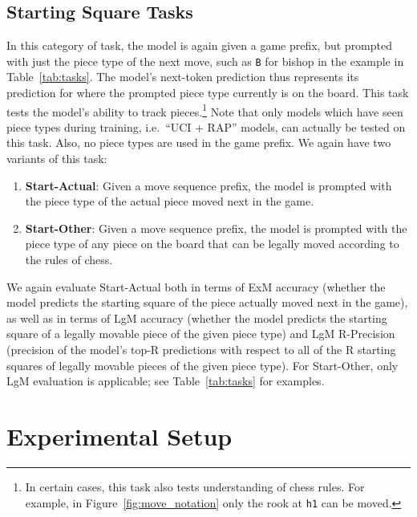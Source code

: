 \documentclass[12pt]{thesis-umich}[thesis]
\newcommand{\pos}[1]{\texttt{#1}}
\newcommand{\legalmove}{LgM\xspace}
\newcommand{\exactmove}{ExM\xspace}
\begin{document}
\subsection{Starting Square Tasks}
In this category of task, the model is again given a game prefix, but prompted with just the piece type of the next move, such as \pos{B} for bishop in the example in Table~\ref{tab:tasks}. The model's next-token prediction thus represents its prediction for where the prompted piece type currently is on the board. This task tests the model's ability to track pieces.\footnote{In certain cases, this task also tests understanding of chess rules. For example, in Figure~\ref{fig:move_notation} only the rook at \pos{h1} can be moved.}
Note that only models which have seen piece types during training, i.e.\ ``UCI + RAP'' models, can actually be tested on this task.
Also, no piece types are used in the game prefix. We again have two variants of this task:
\begin{enumerate}
	\item \textbf{Start-Actual}: Given a move sequence prefix, the model is prompted with the piece type of the actual piece moved next in the game. 
	\item \textbf{Start-Other}: Given a move sequence prefix, the model is prompted with the piece type of any piece on the board that can be legally moved according to the rules of chess. \end{enumerate}
We again evaluate Start-Actual both in terms of \exactmove accuracy (whether the model predicts the starting square of the piece actually moved next in the game), as well as in terms of \legalmove accuracy (whether the model predicts the starting square of a legally movable piece of the given piece type) and \legalmove R-Precision (precision of the model's top-R predictions with respect to all of the R starting squares of legally movable pieces of the given piece type). For Start-Other, only \legalmove evaluation is applicable; see Table~\ref{tab:tasks} for examples.

 \section{Experimental Setup}
\label{sec:setup}
\end{document}

